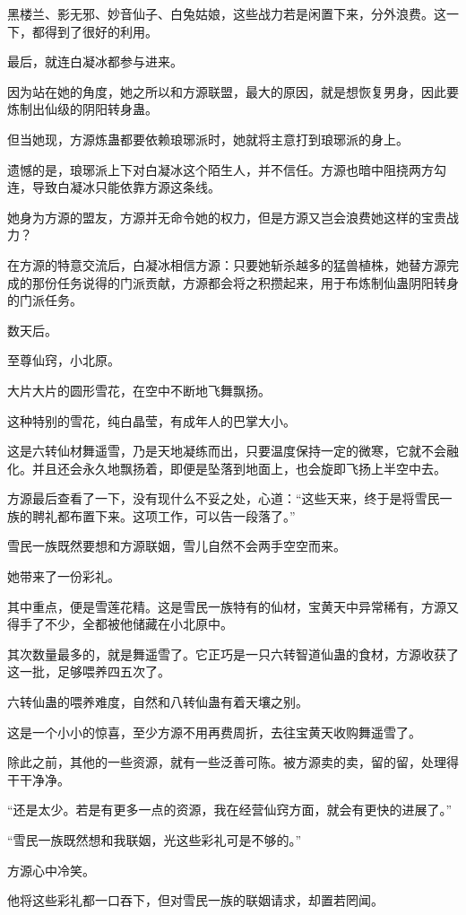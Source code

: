 \begin{this_body}
黑楼兰、影无邪、妙音仙子、白兔姑娘，这些战力若是闲置下来，分外浪费。这一下，都得到了很好的利用。

最后，就连白凝冰都参与进来。

因为站在她的角度，她之所以和方源联盟，最大的原因，就是想恢复男身，因此要炼制出仙级的阴阳转身蛊。

但当她现，方源炼蛊都要依赖琅琊派时，她就将主意打到琅琊派的身上。

遗憾的是，琅琊派上下对白凝冰这个陌生人，并不信任。方源也暗中阻挠两方勾连，导致白凝冰只能依靠方源这条线。

她身为方源的盟友，方源并无命令她的权力，但是方源又岂会浪费她这样的宝贵战力？

在方源的特意交流后，白凝冰相信方源：只要她斩杀越多的猛兽植株，她替方源完成的那份任务说得的门派贡献，方源都会将之积攒起来，用于布炼制仙蛊阴阳转身的门派任务。

数天后。

至尊仙窍，小北原。

大片大片的圆形雪花，在空中不断地飞舞飘扬。

这种特别的雪花，纯白晶莹，有成年人的巴掌大小。

这是六转仙材舞遥雪，乃是天地凝练而出，只要温度保持一定的微寒，它就不会融化。并且还会永久地飘扬着，即便是坠落到地面上，也会旋即飞扬上半空中去。

方源最后查看了一下，没有现什么不妥之处，心道：“这些天来，终于是将雪民一族的聘礼都布置下来。这项工作，可以告一段落了。”

雪民一族既然要想和方源联姻，雪儿自然不会两手空空而来。

她带来了一份彩礼。

其中重点，便是雪莲花精。这是雪民一族特有的仙材，宝黄天中异常稀有，方源又得手了不少，全都被他储藏在小北原中。

其次数量最多的，就是舞遥雪了。它正巧是一只六转智道仙蛊的食材，方源收获了这一批，足够喂养四五次了。

六转仙蛊的喂养难度，自然和八转仙蛊有着天壤之别。

这是一个小小的惊喜，至少方源不用再费周折，去往宝黄天收购舞遥雪了。

除此之前，其他的一些资源，就有一些泛善可陈。被方源卖的卖，留的留，处理得干干净净。

“还是太少。若是有更多一点的资源，我在经营仙窍方面，就会有更快的进展了。”

“雪民一族既然想和我联姻，光这些彩礼可是不够的。”

方源心中冷笑。

他将这些彩礼都一口吞下，但对雪民一族的联姻请求，却置若罔闻。


\end{this_body}
